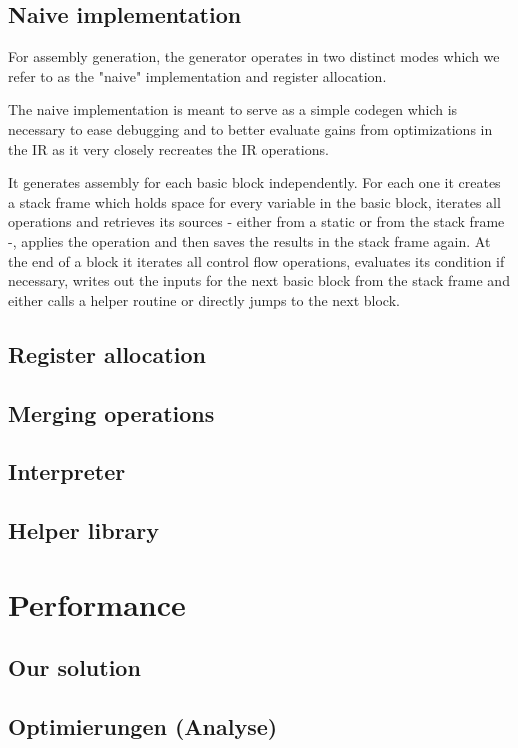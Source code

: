 \documentclass[course=eragp]{aspdoc}
\begin{document}
\subsection{Naive implementation}
For assembly generation, the generator operates in two distinct modes which we refer to as the "naive" implementation and register allocation.
\par
The naive implementation is meant to serve as a simple codegen which is necessary to ease debugging and to better evaluate gains from
optimizations in the IR as it very closely recreates the IR operations.

\par

It generates assembly for each basic block independently.
For each one it creates a stack frame which holds space for every variable in the basic block, iterates all operations and
retrieves its sources - either from a static or from the stack frame -, applies the operation and then saves the results in the stack frame again.
At the end of a block it iterates all control flow operations, evaluates its condition if necessary, writes out the inputs for the next basic block
from the stack frame and either calls a helper routine or directly jumps to the next block.

\subsection{Register allocation}
\subsection{Merging operations}
\subsection{Interpreter}
\subsection{Helper library}\label{helper}

\section{Performance}
\subsection{Our solution}
\subsection{Optimierungen (Analyse)}
\end{document}
